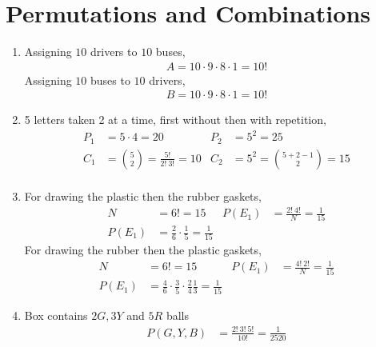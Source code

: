 \section{Permutations and Combinations}

\begin{enumerate}
    \item Assigning $ 10 $ drivers to $ 10 $ buses,
          \begin{align}
              A = 10 \cdot 9 \cdot 8 \cdot 1 = 10!
          \end{align}
          Assigning $ 10 $ buses to $ 10 $ drivers,
          \begin{align}
              B = 10 \cdot 9 \cdot 8 \cdot 1 = 10!
          \end{align}

    \item 5 letters taken 2 at a time, first without then with repetition,
          \begin{align}
              P_1 & = 5 \cdot 4 = 20                        &
              P_2 & = 5^2 = 25                                \\
              C_1 & = \binom{5}{2} = \frac{5!}{2!\ 3!} = 10 &
              C_2 & = 5^2 = \binom{5+2-1}{2} = 15             \\
          \end{align}

    \item For drawing the plastic then the rubber gaskets,
          \begin{align}
              N      & = 6! = 15                                      &
              P(E_1) & = \frac{2!\ 4!}{N} = \frac{1}{15}                \\
              P(E_1) & = \frac{2}{6} \cdot \frac{1}{5} = \frac{1}{15}
          \end{align}
          For drawing the rubber then the plastic gaskets,
          \begin{align}
              N      & = 6! = 15                                         &
              P(E_1) & = \frac{4!\ 2!}{N} = \frac{1}{15}                   \\
              P(E_1) & = \frac{4}{6} \cdot \frac{3}{5} \cdot \frac{2}{4}
              \frac{1}{3} = \frac{1}{15}
          \end{align}

    \item Box contains $ 2G, 3Y $ and $ 5R $ balls
          \begin{align}
              P(G,Y,B) & = \frac{2!\ 3!\ 5!}{10!} = \frac{1}{2520}
          \end{align}


\end{enumerate}
